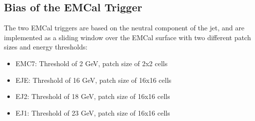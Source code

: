 \subsection{Bias of the EMCal Trigger}
\label{sec:EMCTriggerBias}

The two EMCal triggers are based on the neutral component of the jet, and are implemented as a sliding window over the EMCal surface with two different patch sizes and energy thresholds:

\begin{itemize}
    \item EMC7: Threshold of 2 GeV, patch size of 2x2 cells
    \item EJE: Threshold of 16 GeV, patch size of 16x16 cells
    \item EJ2: Threshold of 18 GeV, patch size of 16x16 cells
    \item EJ1: Threshold of 23 GeV, patch size of 16x16 cells
\end{itemize}

